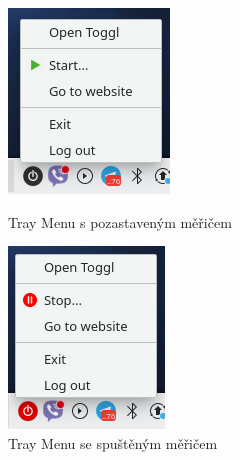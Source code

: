 \documentclass[thesis=B,czech]{FITthesis}[2012/06/26]
\begin{document}
\begin{figure}[!htb]
	\includegraphics[width=\linewidth]{toggl_tray_menu.png}
	\caption{Tray Menu s pozastaveným měřičem}\label{fig:t_t_m}
	\endminipage\hfill
	\includegraphics[width=\linewidth]{toggl_try_menu_stop.png}
	\caption{Tray Menu se spuštěným měřičem}\label{fig:t_t_m_s}
	\endminipage\hfill
\end{figure}
\end{document}
